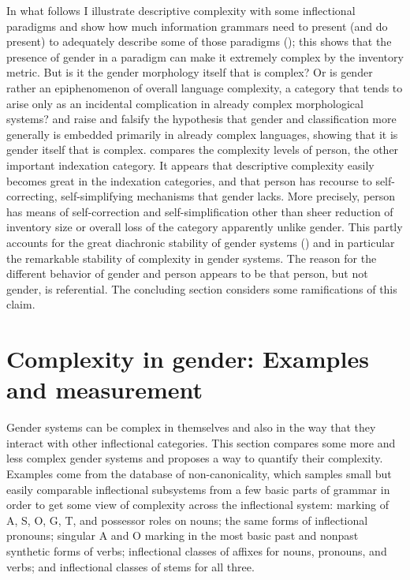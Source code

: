 \documentclass[output=collectionpaper]{langsci/langscibook}
\begin{document}
In what follows I illustrate descriptive complexity with some inflectional para\-digms and show how much information grammars need to present (and do pre\-sent) to adequately describe some of those paradigms (); this shows that the presence of gender in a paradigm can make it extremely complex by the inventory metric. But is it the gender morphology itself that is complex? Or is gender rather an epiphenomenon of overall language complexity, a category that tends to arise only as an incidental complication in already complex morphological systems?  and  raise and falsify the hypothesis that gender \textendash{} and classification more generally \textendash{} is embedded primarily in already complex languages, showing that it is gender itself that is complex.  compares the complexity levels of person, the other important indexation category. It appears that descriptive complexity easily becomes great in the indexation categories, and that person has recourse to self-correcting, self-simplifying mechanisms that gender lacks. More precisely, person has means of self-correction and self-simplification other than sheer reduction of inventory size or overall loss of the category \textendash{} apparently unlike gender. This partly accounts for the great diachronic stability of gender systems (\citealt{Matasovic2014}) and in particular the remarkable stability of complexity in gender systems. The reason for the different behavior of gender and person appears to be that person, but not gender, is referential. The concluding section considers some ramifications of this claim.

\section{Complexity in gender: Examples and measurement}
\label{sec:Nich:2}

Gender systems can be complex in themselves and also in the way that they interact with other inflectional categories. This section compares some more and less complex gender systems and proposes a way to quantify their complexity. Examples come from the database of non-canonicality, which samples small but easily comparable inflectional subsystems from a few basic parts of grammar in order to get some view of complexity across the inflectional system: marking of A, S, O, G, T, and possessor roles on nouns; the same forms of inflectional pronouns; singular A and O marking in the most basic past and nonpast synthetic forms of verbs; inflectional classes of affixes for nouns, pronouns, and verbs; and inflectional classes of stems for all three.
\end{document}

